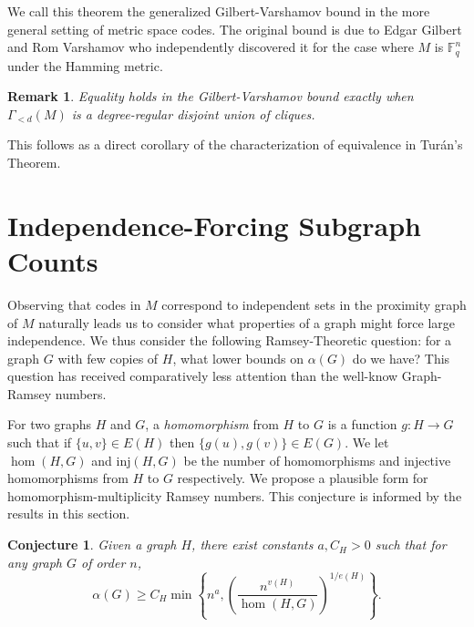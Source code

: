 \documentclass[12pt]{article}
\newtheorem{conjecture}[theorem]{Conjecture}
\newtheorem{remark}{Remark}
\newcommand{\inj}{\mathrm{inj}}
\newcommand{\Fq}{\mathbb{F}_q}
\begin{document}
We call this theorem the generalized Gilbert-Varshamov bound in the more general setting of metric space codes. The original bound is due to Edgar Gilbert \cite{gilbert1952} and Rom Varshamov \cite{varshamov1957} who independently discovered it for the case where $M$ is $\Fq^n$ under the Hamming metric.



\begin{remark}
\label{rmk: GV char}
    Equality holds in the Gilbert-Varshamov bound exactly when $\Gamma_{<d}(M)$ is a degree-regular disjoint union of cliques.
\end{remark}
This follows as a direct corollary of the characterization of equivalence in Tur\'an's Theorem.



\section{Independence-Forcing Subgraph Counts}

Observing that codes in $M$ correspond to independent sets in the proximity graph of $M$ naturally leads us to consider what properties of a graph might force large independence. We thus consider the following Ramsey-Theoretic question: for a graph $G$ with few copies of $H$, what lower bounds on $\alpha(G)$ do we have? This question has received comparatively less attention than the well-know Graph-Ramsey numbers.



For two graphs $H$ and $G$, a \textit{homomorphism} from $H$ to $G$ is a function $g:H\to G$ such that if $\{u,v\}\in E(H)$ then $\{g(u),g(v)\}\in E(G)$. We  let $\hom(H,G)$ and $\inj(H,G)$ be the number of homomorphisms and injective homomorphisms from $H$ to $G$ respectively. We propose a plausible form for homomorphism-multiplicity Ramsey numbers.  This conjecture is informed by the results in this section.
\begin{conjecture}
\label{conj: Ramsey-Sidorenko}
    Given a graph $H$, there exist constants $a,C_H>0$ such that for any graph $G$ of order $n$,
    \[
    \alpha(G)\geq C_H\min\left\{n^{a},\left(\frac{n^{v(H)}}{\hom(H,G)}\right)^{1/e(H)}\right\}.
    \]
\end{conjecture}
\end{document}
